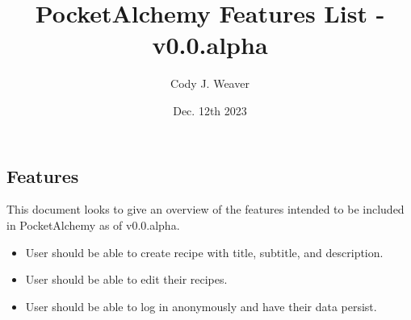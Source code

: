 \documentclass[12pt]{article}
\begin{document}
\title{PocketAlchemy Features List - v0.0.alpha}
\author{Cody J. Weaver}
\date{Dec. 12th 2023}
\maketitle

\begin{center}
    \section*{Features}
    \indent This document looks to give an overview of the 
    features intended to be included
    in PocketAlchemy as of v0.0.alpha.

    \begin{itemize}
        \item User should be able to create recipe with title, 
        subtitle, and description.

        \item User should be able to edit their recipes.
        
        \item User should be able to log in anonymously and have their
        data persist.

    \end{itemize}

\end{center}
\end{document}
